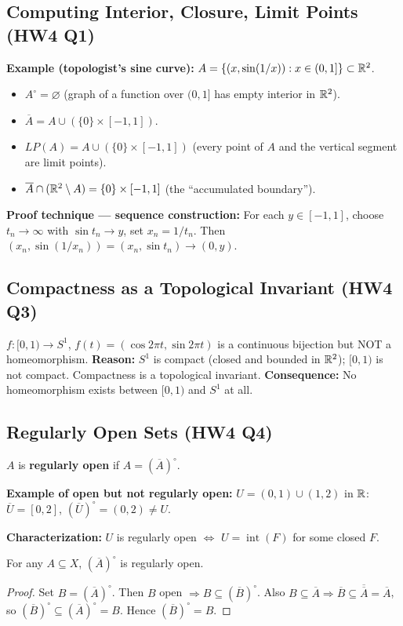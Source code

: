 \documentclass{article}
\begin{document}
\subsection{Computing Interior, Closure, Limit Points (HW4 Q1)}
\textbf{Example (topologist's sine curve):}
$A = \{(x, \sin(1/x)) : x \in (0, 1]\} \subset \mathbb{R}^2$.
\begin{itemize}
  \item $A^\circ = \varnothing$ (graph of a function over $(0,1]$ has
    empty interior in $\mathbb{R}^2$).
  \item $\overline{A} = A \cup (\{0\} \times [-1, 1])$.
  \item $LP(A) = A \cup (\{0\} \times [-1, 1])$ (every point of $A$
    and the vertical segment are limit points).
  \item $\overline{A} \cap (\mathbb{R}^2 \setminus A) = \{0\} \times [-1, 1]$
    (the ``accumulated boundary'').
\end{itemize}
\textbf{Proof technique --- sequence construction:} For each $y \in
[-1, 1]$, choose $t_n \to \infty$ with $\sin t_n \to y$, set $x_n =
1/t_n$. Then $(x_n, \sin(1/x_n)) = (x_n, \sin t_n) \to (0, y)$.

\subsection{Compactness as a Topological Invariant (HW4 Q3)}
$f : [0,1) \to S^1$, $f(t) = (\cos 2\pi t, \sin 2\pi t)$ is a
continuous bijection but NOT a homeomorphism.
\textbf{Reason:} $S^1$ is compact (closed and bounded in $\mathbb{R}^2$);
$[0,1)$ is not compact. Compactness is a topological invariant.
\textbf{Consequence:} No homeomorphism exists between $[0,1)$ and $S^1$ at all.

\subsection{Regularly Open Sets (HW4 Q4)}
\begin{definition}
  $A$ is \textbf{regularly open} if $A = (\overline{A})^\circ$.
\end{definition}
\textbf{Example of open but not regularly open:} $U = (0,1) \cup (1,2)$ in $\mathbb{R}$:
$\overline{U} = [0,2]$, $(\overline{U})^\circ = (0,2) \ne U$.

\textbf{Characterization:} $U$ is regularly open $\iff$ $U =
\operatorname{int}(F)$ for some closed $F$.

\begin{proposition}
  For any $A \subseteq X$, $(\overline{A})^\circ$ is regularly open.
\end{proposition}
\begin{proof}
  Set $B = (\overline{A})^\circ$. Then $B$ open $\Rightarrow B
  \subseteq (\overline{B})^\circ$.
  Also $B \subseteq \overline{A} \Rightarrow \overline{B} \subseteq
  \overline{\overline{A}} = \overline{A}$, so $(\overline{B})^\circ
  \subseteq (\overline{A})^\circ = B$.
  Hence $(\overline{B})^\circ = B$.
\end{proof}
\end{document}
